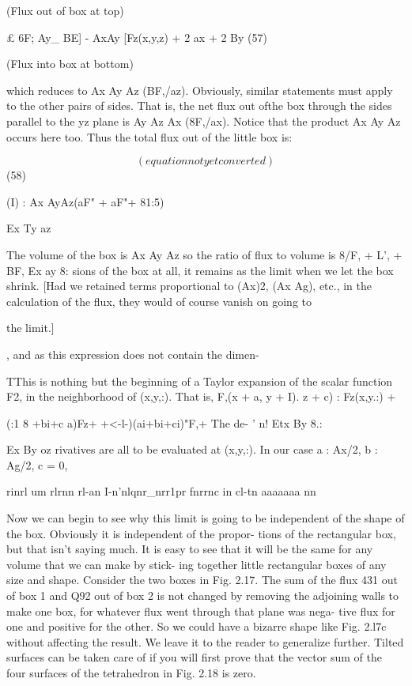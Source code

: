  
(Flux out of box at top)

£ 6F; Ay_ BE]
- AxAy [Fz(x,y,z) + 2 ax + 2 By (57)

(Flux into box at bottom)

which reduces to Ax Ay Az (BF,/az). Obviously, similar statements
must apply to the other pairs of sides. That is, the net flux out ofthe
box through the sides parallel to the yz plane is Ay Az Ax (8F,/ax).
Notice that the product Ax Ay Az occurs here too. Thus the total
flux out of the little box is:

\begin{equation}
(equation not yet converted)
\end{equation}
(58)

(I) : Ax AyAz(aF" + aF"+ 81:5)

Ex Ty az

The volume of the box is Ax Ay Az so the ratio of flux to volume is
8/F, + L', + BF,
Ex ay 8:
sions of the box at all, it remains as the limit when we let the box
shrink. [Had we retained terms proportional to (Ax)2, (Ax Ag), etc.,
in the calculation of the flux, they would of course vanish on going to

the limit.]

, and as this expression does not contain the dimen-

TThis is nothing but the beginning of a Taylor expansion of the scalar function F2,
in the neighborhood of (x,y,:). That is, F,(x + a, y + I). z + c) : Fz(x,y.:) +

(:1 8 +bi+c a)Fz+  +<-l-)(ai+bi+ci)"F,+  The de-
' n! Etx By 8.:

Ex By oz
rivatives are all to be evaluated at (x,y,:). In our case a : Ax/2, b : Ag/2, c = 0,

rinrl um rlrnn rl-an I-n'nlqnr_nrr1pr fnrrnc in cl-tn aaaaaaa nn

Now we can begin to see why this limit is going to be independent
of the shape of the box. Obviously it is independent of the propor-
tions of the rectangular box, but that isn't saying much. It is easy to
see that it will be the same for any volume that we can make by stick-
ing together little rectangular boxes of any size and shape. Consider
the two boxes in Fig. 2.17. The sum of the flux 431 out of box 1 and
Q92 out of box 2 is not changed by removing the adjoining walls to
make one box, for whatever flux went through that plane was nega-
tive flux for one and positive for the other. So we could have a
bizarre shape like Fig. 2.l7c without affecting the result. We leave it
to the reader to generalize further. Tilted surfaces can be taken care
of if you will first prove that the vector sum of the four surfaces of the
tetrahedron in Fig. 2.18 is zero.

